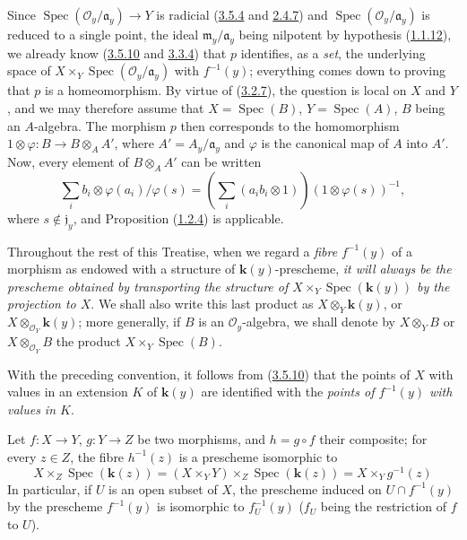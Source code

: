 Since $\operatorname{Spec}(\mathcal{O}_y/\mathfrak{a}_y)\to Y$ is radicial
(\hyperref[I.3.5.4]{3.5.4} and \hyperref[I.2.4.7]{2.4.7}) and
$\operatorname{Spec}(\mathcal{O}_y/\mathfrak{a}_y)$ is reduced to a single
point, the ideal $\mathfrak{m}_y/\mathfrak{a}_y$ being nilpotent by hypothesis
(\hyperref[I.1.1.12]{1.1.12}), we already know
(\hyperref[I.3.5.10]{3.5.10} and \hyperref[I.3.3.4]{3.3.4}) that $p$
identifies, as a \emph{set}, the underlying space of
$X\times_Y\operatorname{Spec}(\mathcal{O}_y/\mathfrak{a}_y)$ with $f^{-1}(y)$;
everything comes down to proving that $p$ is a homeomorphism. By virtue of
(\hyperref[I.3.2.7]{3.2.7}), the question is local on $X$ and $Y$, and we
may therefore assume that $X=\operatorname{Spec}(B)$,
$Y=\operatorname{Spec}(A)$, $B$ being an $A$-algebra. The morphism $p$
then corresponds to the homomorphism
$1\otimes\varphi:B\to B\otimes_A A'$, where $A'=A_y/\mathfrak{a}_y$ and
$\varphi$ is the canonical map of $A$ into $A'$. Now, every element of
$B\otimes_A A'$ can be written
\label{I.3.6.1.localization-fraction}
\[
  \sum_i b_i\otimes\varphi(a_i)/\varphi(s)
  =\left(\sum_i(a_i b_i\otimes 1)\right)(1\otimes\varphi(s))^{-1},
\]
where $s\notin\mathfrak{j}_y$, and Proposition
(\hyperref[I.1.2.4]{1.2.4}) is applicable.

\begin{env}[3.6.2]
\label{I.3.6.2}
Throughout the rest of this Treatise, when we regard a \emph{fibre}
$f^{-1}(y)$ of a morphism as endowed with a structure of $\boldsymbol{k}(y)$-prescheme,
\emph{it will always be the prescheme obtained by transporting the structure
of $X\times_Y\operatorname{Spec}(\boldsymbol{k}(y))$ by the projection to $X$}. We
shall also write this last product as $X\otimes_Y \boldsymbol{k}(y)$, or
$X\otimes_{\mathcal{O}_Y}\boldsymbol{k}(y)$; more generally, if $B$ is an
$\mathcal{O}_y$-algebra, we shall denote by $X\otimes_Y B$ or
$X\otimes_{\mathcal{O}_Y}B$ the product
$X\times_Y\operatorname{Spec}(B)$.
\end{env}

With the preceding convention, it follows from
(\hyperref[I.3.5.10]{3.5.10}) that the points of $X$ with values in an
extension $K$ of $\boldsymbol{k}(y)$ are identified with the \emph{points of $f^{-1}(y)$
with values in $K$}.

\begin{env}[3.6.3]
\label{I.3.6.3}
Let $f:X\to Y$, $g:Y\to Z$ be two morphisms, and $h=g\circ f$ their composite;
for every $z\in Z$, the fibre $h^{-1}(z)$ is a prescheme isomorphic to
\label{I.3.6.3.fibre-composition}
\[
  X\times_Z\operatorname{Spec}(\boldsymbol{k}(z))
  =(X\times_Y Y)\times_Z\operatorname{Spec}(\boldsymbol{k}(z))
  =X\times_Y g^{-1}(z)
\]
In particular, if $U$ is an open subset of $X$, the prescheme induced on
$U\cap f^{-1}(y)$ by the prescheme $f^{-1}(y)$ is isomorphic to
$f_U^{-1}(y)$ ($f_U$ being the restriction of $f$ to $U$).
\end{env}

